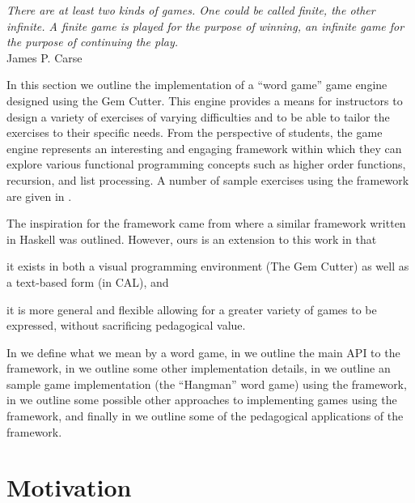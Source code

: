 \label{chapter:eval}

\begin{flushright}
\textit{There are at least two kinds of games.  One could be called finite, the other infinite. A finite game is played for the purpose of winning, an infinite game for the purpose of continuing the play.}
\\
James P. Carse \cite{Carse87} \\
\end{flushright}

In this section we outline the implementation of a ``word game'' game engine designed using the Gem Cutter.  This engine provides a means for instructors to design a variety of exercises of varying difficulties and to be able to tailor the exercises to their specific needs.  From the perspective of students, the game engine represents an interesting and engaging framework within which they can explore various functional programming concepts such as higher order functions, recursion, and list processing.  A number of sample exercises using the framework are given in .

The inspiration for the framework came from \cite{Curtis05} where a similar framework written in Haskell was outlined.  However, ours is an extension to this work in that \begin{inparaenum}\item it exists in both a visual programming environment (The Gem Cutter) as well as a text-based form (in CAL), and \item it is more general and flexible allowing for a greater variety of games to be expressed, without sacrificing pedagogical value.\end{inparaenum}

In  we define what we mean by a word game, in  we outline the main API to the framework, in  we outline some other implementation details, in  we outline an sample game implementation (the ``Hangman'' word game) using the framework, in  we outline some possible other approaches to implementing games using the framework, and finally in  we outline some of the pedagogical applications of the framework.


\section{Motivation}
\label{wordGameMotivation}

